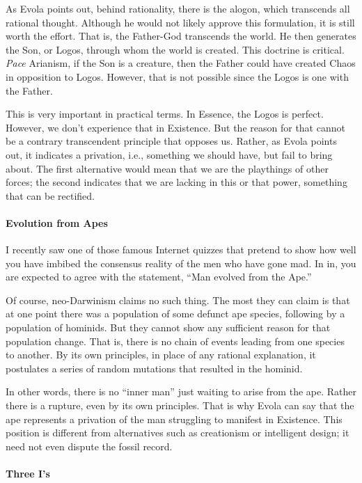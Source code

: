 As Evola points out, behind rationality, there is the alogon, which transcends all rational thought. Although he would not likely approve this formulation, it is still worth the effort. That is, the Father-God transcends the world. He then generates the Son, or Logos, through whom the world is created. This doctrine is critical. \emph{Pace} Arianism, if the Son is a creature, then the Father could have created Chaos in opposition to Logos. However, that is not possible since the Logos is one with the Father.

This is very important in practical terms. In Essence, the Logos is perfect. However, we don't experience that in Existence. But the reason for that cannot be a contrary transcendent principle that opposes us. Rather, as Evola points out, it indicates a privation, i.e., something we should have, but fail to bring about. The first alternative would mean that we are the playthings of other forces; the second indicates that we are lacking in this or that power, something that can be rectified.

\paragraph{Evolution from Apes}


I recently saw one of those famous Internet quizzes that pretend to show how well you have imbibed the consensus reality of the men who have gone mad. In in, you are expected to agree with the statement, ``Man evolved from the Ape.''

Of course, neo-Darwinism claims no such thing. The most they can claim is that at one point there was a population of some defunct ape species, following by a population of hominids. But they cannot show any sufficient reason for that population change. That is, there is no chain of events leading from one species to another. By its own principles, in place of any rational explanation, it postulates a series of random mutations that resulted in the hominid.

In other words, there is no ``inner man'' just waiting to arise from the ape. Rather there is a rupture, even by its own principles. That is why Evola can say that the ape represents a privation of the man struggling to manifest in Existence. This position is different from alternatives such as creationism or intelligent design; it need not even dispute the fossil record.

\paragraph{Three I's}


